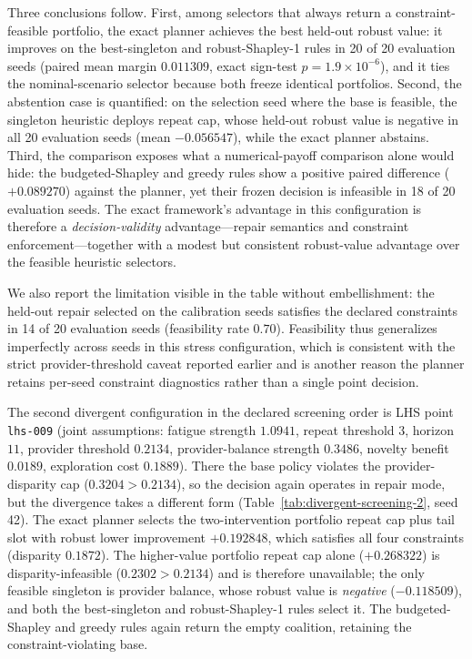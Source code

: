 \documentclass[pdflatex,sn-mathphys-num]{sn-jnl}
\theoremstyle{thmstyleone}
\theoremstyle{thmstyletwo}
\theoremstyle{thmstylethree}
\begin{document}
Three conclusions follow. First, among selectors that always return a constraint-feasible portfolio, the exact planner achieves the best held-out robust value: it improves on the best-singleton and robust-Shapley-1 rules in 20 of 20 evaluation seeds (paired mean margin $0.011309$, exact sign-test $p=1.9\times10^{-6}$), and it ties the nominal-scenario selector because both freeze identical portfolios. Second, the abstention case is quantified: on the selection seed where the base is feasible, the singleton heuristic deploys repeat cap, whose held-out robust value is negative in all 20 evaluation seeds (mean $-0.056547$), while the exact planner abstains. Third, the comparison exposes what a numerical-payoff comparison alone would hide: the budgeted-Shapley and greedy rules show a positive paired difference ($+0.089270$) against the planner, yet their frozen decision is infeasible in 18 of 20 evaluation seeds. The exact framework's advantage in this configuration is therefore a \emph{decision-validity} advantage---repair semantics and constraint enforcement---together with a modest but consistent robust-value advantage over the feasible heuristic selectors.

We also report the limitation visible in the table without embellishment: the held-out repair selected on the calibration seeds satisfies the declared constraints in 14 of 20 evaluation seeds (feasibility rate $0.70$). Feasibility thus generalizes imperfectly across seeds in this stress configuration, which is consistent with the strict provider-threshold caveat reported earlier and is another reason the planner retains per-seed constraint diagnostics rather than a single point decision.

The second divergent configuration in the declared screening order is LHS point \texttt{lhs-009} (joint assumptions: fatigue strength $1.0941$, repeat threshold $3$, horizon $11$, provider threshold $0.2134$, provider-balance strength $0.3486$, novelty benefit $0.0189$, exploration cost $0.1889$). There the base policy violates the provider-disparity cap ($0.3204>0.2134$), so the decision again operates in repair mode, but the divergence takes a different form (Table~\ref{tab:divergent-screening-2}, seed 42). The exact planner selects the two-intervention portfolio repeat cap plus tail slot with robust lower improvement $+0.192848$, which satisfies all four constraints (disparity $0.1872$). The higher-value portfolio repeat cap alone ($+0.268322$) is disparity-infeasible ($0.2302>0.2134$) and is therefore unavailable; the only feasible singleton is provider balance, whose robust value is \emph{negative} ($-0.118509$), and both the best-singleton and robust-Shapley-1 rules select it. The budgeted-Shapley and greedy rules again return the empty coalition, retaining the constraint-violating base.
\end{document}
